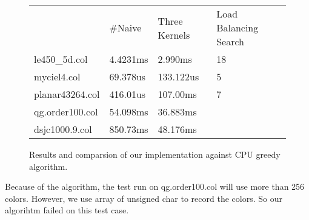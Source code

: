 \documentclass[12pt] {article}
\begin{document}
\begin{figure}[tbh]
 \centering    
\begin{tabular}{ |p{4cm}||p{3cm}|| p{4cm}|p{4cm}|}
 \hline
   & $\#$Naive & Three Kernels &  Load Balancing Search \\ 
     
     \hhline{|=||=|=|=|}
 \hline
 le450\_5d.col & 4.4231ms  & 2.990ms  &18 \\
 \hline
 myciel4.col & 69.378us       & 133.122us  &5 \\
 \hline
   planar43264.col & 416.01us &  107.00ms & 7\\
 \hline
   qg.order100.col & 54.098ms & 36.883ms   & \\
 \hline
   dsjc1000.9.col & 850.73ms & 48.176ms   & \\
 \hline
 
 
\end{tabular} 
\caption{Results and comparsion of our implementation against CPU greedy algorithm.}
   \label{tab:results}
\end{figure} 

Because of the algorithm, the test run on qg.order100.col will use more than 256 colors. However, we use array of unsigned char to record the colors. So our algorihtm failed on this test case.
\end{document}
